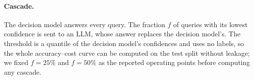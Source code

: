 \paragraph{Cascade.} The decision model answers every query. The fraction $f$ of queries with its lowest confidence
is sent to an LLM, whose answer replaces the decision model's. The threshold is a quantile of the decision model's
confidences and uses no labels, so the
whole accuracy--cost curve can be computed on the test split without leakage; we fixed $f=25\%$ and $f=50\%$ as the
reported operating points before computing any cascade.
